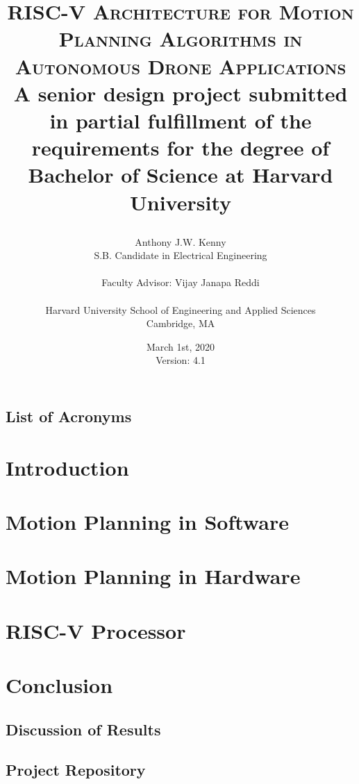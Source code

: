 \documentclass[
    11pt,           %
    letterpaper,    %
    draft,          %
    oneside         %
]{report}           %
\title{\textsc{RISC-V Architecture for Motion Planning Algorithms in Autonomous Drone Applications} \\ 
    \bigskip
    \small{A senior design project submitted in partial fulfillment of the requirements for the degree of Bachelor of Science at Harvard University} \\
\author{Anthony J.W. Kenny \\
        \small{S.B. Candidate in Electrical Engineering} \\ \\
        Faculty Advisor: Vijay Janapa Reddi \\ \\
        Harvard University School of Engineering and Applied Sciences \\
        \small{Cambridge, MA}}
\date{March 1st, 2020 \\ 
    \small{Version: 4.1}}}
\begin{document}
\maketitle


    
    \clearpage

    \tableofcontents
    \clearpage

    \section*{List of Acronyms}
    

    \listofalgorithms
 
    \listoffigures

    \listoftables



\chapter{Introduction}
    


\chapter{Motion Planning in Software}
    \label{chap:MotionPlanningInSoftware}
    

\chapter{Motion Planning in Hardware}
    \label{chap:MotionPlanningInHardware}
    

\chapter{RISC-V Processor}
    \label{chap:RiscvProcessor}
    

\chapter{Conclusion}
    \section{Discussion of Results}




\begin{appendices}

\chapter{Project Repository}
    \label{appendix:repository}
    

\end{appendices}
\clearpage
\listoftodos
\end{document}
